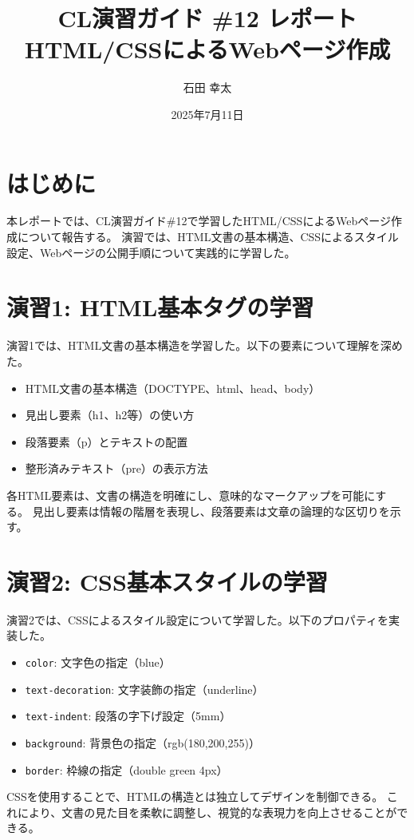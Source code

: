 \documentclass[a4paper,12pt]{jarticle}
\title{CL演習ガイド \#12 レポート\\HTML/CSSによるWebページ作成}
\author{石田 幸太}
\date{2025年7月11日}
\begin{document}
\maketitle

\section{はじめに}
本レポートでは、CL演習ガイド\#12で学習したHTML/CSSによるWebページ作成について報告する。
演習では、HTML文書の基本構造、CSSによるスタイル設定、Webページの公開手順について実践的に学習した。

\section{演習1: HTML基本タグの学習}
演習1では、HTML文書の基本構造を学習した。以下の要素について理解を深めた。

\begin{itemize}
\item HTML文書の基本構造（DOCTYPE、html、head、body）
\item 見出し要素（h1、h2等）の使い方
\item 段落要素（p）とテキストの配置
\item 整形済みテキスト（pre）の表示方法
\end{itemize}

各HTML要素は、文書の構造を明確にし、意味的なマークアップを可能にする。
見出し要素は情報の階層を表現し、段落要素は文章の論理的な区切りを示す。

\section{演習2: CSS基本スタイルの学習}
演習2では、CSSによるスタイル設定について学習した。以下のプロパティを実装した。

\begin{itemize}
\item \texttt{color}: 文字色の指定（blue）
\item \texttt{text-decoration}: 文字装飾の指定（underline）
\item \texttt{text-indent}: 段落の字下げ設定（5mm）
\item \texttt{background}: 背景色の指定（rgb(180,200,255)）
\item \texttt{border}: 枠線の指定（double green 4px）
\end{itemize}

CSSを使用することで、HTMLの構造とは独立してデザインを制御できる。
これにより、文書の見た目を柔軟に調整し、視覚的な表現力を向上させることができる。
\end{document}
